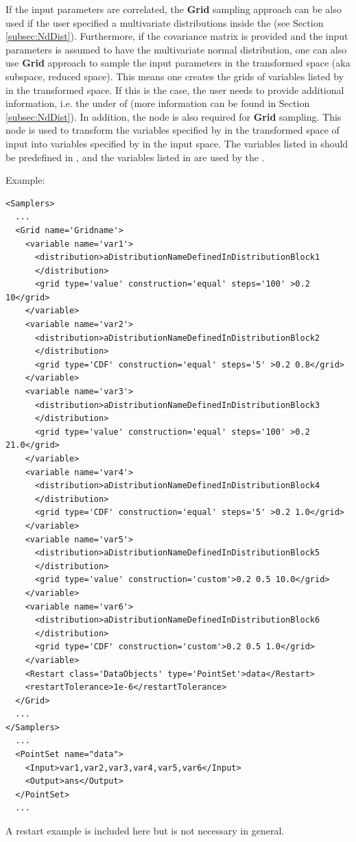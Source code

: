 If the input parameters are correlated, the \textbf{Grid} sampling approach can be also used if the user specified a
multivariate distributions inside the  (see Section \ref{subsec:NdDist}). Furthermore, if the
covariance matrix is provided and the input parameters is assumed to have the multivariate normal distribution, one can also use
\textbf{Grid} approach to sample the input parameters in the transformed space (aka subspace, reduced space). This means one creates
the grids of variables listed by  in the transformed space. If this is the case, the user needs to
provide additional information, i.e. the  under  of 
(more information can be found in Section \ref{subsec:NdDist}). In addition, the node  is also
required for \textbf{Grid} sampling. This node is used to transform the variables specified by  in the
transformed space of input into variables specified by  in the input space. The variables listed
in  should be predefined in , and the variables listed in 
are used by the .



Example:
\begin{lstlisting}[style=XML,morekeywords={construction,steps,lowerBound,upperBound}]
<Samplers>
  ...
  <Grid name='Gridname'>
    <variable name='var1'>
      <distribution>aDistributionNameDefinedInDistributionBlock1
      </distribution>
      <grid type='value' construction='equal' steps='100' >0.2 10</grid>
    </variable>
    <variable name='var2'>
      <distribution>aDistributionNameDefinedInDistributionBlock2
      </distribution>
      <grid type='CDF' construction='equal' steps='5' >0.2 0.8</grid>
    </variable>
    <variable name='var3'>
      <distribution>aDistributionNameDefinedInDistributionBlock3
      </distribution>
      <grid type='value' construction='equal' steps='100' >0.2 21.0</grid>
    </variable>
    <variable name='var4'>
      <distribution>aDistributionNameDefinedInDistributionBlock4
      </distribution>
      <grid type='CDF' construction='equal' steps='5' >0.2 1.0</grid>
    </variable>
    <variable name='var5'>
      <distribution>aDistributionNameDefinedInDistributionBlock5
      </distribution>
      <grid type='value' construction='custom'>0.2 0.5 10.0</grid>
    </variable>
    <variable name='var6'>
      <distribution>aDistributionNameDefinedInDistributionBlock6
      </distribution>
      <grid type='CDF' construction='custom'>0.2 0.5 1.0</grid>
    </variable>
    <Restart class='DataObjects' type='PointSet'>data</Restart>
    <restartTolerance>1e-6</restartTolerance>
  </Grid>
  ...
</Samplers>
  ...
  <PointSet name="data">
    <Input>var1,var2,var3,var4,var5,var6</Input>
    <Output>ans</Output>
  </PointSet>
  ...
\end{lstlisting}
\nb A restart example is included here but is not necessary in general.

